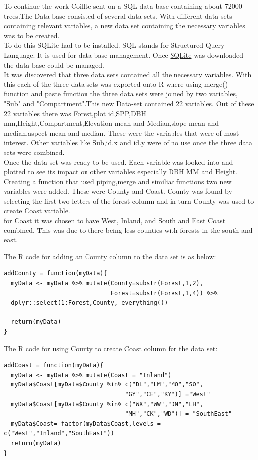 \documentclass[a4paper,11pt,twoside]{report}
\begin{document}
To continue the work Coillte sent on a SQL data base containing about 72000 trees.The Data base consisted of several data-sets. With different data sets containing relevant variables, a new data set containing the necessary variables was to be created.\\
To do this SQLite had to be installed. SQL stands for Structured Query Language. It is used for data base management. Once \href{https://www.sqlite.org/index.html}{SQLite} was downloaded the data base could be managed.\\
It was discovered that three data sets contained all the necessary variables. With this each of the three data sets was exported onto R where using merge() function and paste function the three data sets were joined by two variables, "Sub" and "Compartment".This new Data-set contained 22 variables. Out of these 22 variables there was Forest,plot id,SPP,DBH mm,Height,Compartment,Elevation mean and Median,slope mean and median,aspect mean and median. These were the variables that were of most interest. Other variables like Sub,id.x and id.y were of no use once the three data sets were combined.\\
Once the data set was ready to be used. Each variable was looked into and plotted to see its impact on other variables especially DBH MM and Height.\\
Creating a function that used piping,merge and similiar functions two new variables were added. These were County and Coast. County was found by selecting the first two letters of the forest column and in turn County was used to create Coast variable.\\
for Coast it was chosen to have West, Inland, and South and East Coast combined. This was due to there being less counties with forests in the south and east.\par
The R code for adding an County column to the data set is as below: 
\begin{frame}
\begin{verbatim}
addCounty = function(myData){
  myData <- myData %>% mutate(County=substr(Forest,1,2),
                              Forest=substr(Forest,1,4)) %>%
  dplyr::select(1:Forest,County, everything())
  
  return(myData)
}

\end{verbatim}
\end{frame}
The R code for using County to create Coast column for the data set: 
\begin{frame}
\begin{verbatim}
addCoast = function(myData){
  myData <- myData %>% mutate(Coast = "Inland")
  myData$Coast[myData$County %in% c("DL","LM","MO","SO",
                                  "GY","CE","KY")] ="West"
  myData$Coast[myData$County %in% c("WX","WW","DN","LH",
                                  "MH","CK","WD")] = "SouthEast"
  myData$Coast= factor(myData$Coast,levels =  c("West","Inland","SouthEast"))
  return(myData)
}
  \end{verbatim}
\end{frame}
\end{document}
